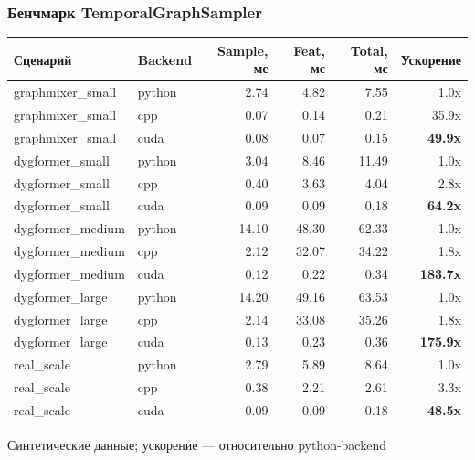 \documentclass[aspectratio=169]{beamer}
\begin{document}
\begin{frame}
  \frametitle{Бенчмарк TemporalGraphSampler}
  \begin{table}
  \footnotesize
  \begin{tabular}{llrrrr}
    \toprule
    \textbf{Сценарий} & \textbf{Backend} & \textbf{Sample, мс} & \textbf{Feat, мс} & \textbf{Total, мс} & \textbf{Ускорение} \\
    \midrule
    graphmixer\_small & python & 2.74 & 4.82 & 7.55 & 1.0x \\
    graphmixer\_small & cpp    & 0.07 & 0.14 & 0.21 & 35.9x \\
    graphmixer\_small & cuda   & 0.08 & 0.07 & 0.15 & \textbf{49.9x} \\
    \midrule
    dygformer\_small  & python & 3.04 & 8.46 & 11.49 & 1.0x \\
    dygformer\_small  & cpp    & 0.40 & 3.63 & 4.04  & 2.8x \\
    dygformer\_small  & cuda   & 0.09 & 0.09 & 0.18  & \textbf{64.2x} \\
    \midrule
    dygformer\_medium & python & 14.10 & 48.30 & 62.33 & 1.0x \\
    dygformer\_medium & cpp    & 2.12  & 32.07 & 34.22 & 1.8x \\
    dygformer\_medium & cuda   & 0.12  & 0.22  & 0.34  & \textbf{183.7x} \\
    \midrule
    dygformer\_large  & python & 14.20 & 49.16 & 63.53 & 1.0x \\
    dygformer\_large  & cpp    & 2.14  & 33.08 & 35.26 & 1.8x \\
    dygformer\_large  & cuda   & 0.13  & 0.23  & 0.36  & \textbf{175.9x} \\
    \midrule
    real\_scale       & python & 2.79  & 5.89  & 8.64  & 1.0x \\
    real\_scale       & cpp    & 0.38  & 2.21  & 2.61  & 3.3x \\
    real\_scale       & cuda   & 0.09  & 0.09  & 0.18  & \textbf{48.5x} \\
    \bottomrule
  \end{tabular}
  \end{table}
  {\small Синтетические данные; ускорение — относительно python-backend}
\end{frame}
\end{document}
